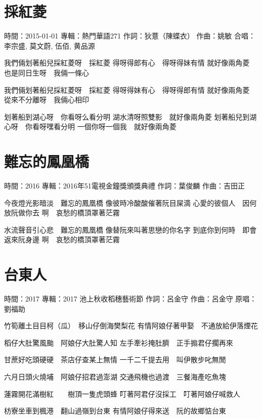 \documentclass[UTF8,a4paper,oneside,twocolumn,12pt]{ctexbook}
\newcommand{\infopair}[2]{\textbullet #1：#2}
\newcommand{\zc}[1][伍佰]{\infopair{作詞}{#1}}
\newcommand{\zq}[1][伍佰]{\infopair{作曲}{#1}}
\newcommand{\zj}[1]{\infopair{專輯}{#1}}
\newcommand{\yc}[1]{\infopair{原唱}{#1}}
\newcommand{\sj}[1]{\infopair{時間}{#1}}
\newenvironment{info}{\begin{flushleft}\kaishu
	}
	{\end{flushleft}\normalsize\yahei\par}
\newenvironment{lyric}{
	}
{}
\begin{document}
\section{採紅菱}
\begin{info}
	\sj{2015-01-01}
	\zj{熱門華語271}
	\zc[狄薏（陳蝶衣）]
	\zq[姚敏]
	\infopair{合唱}{李宗盛, 莫文蔚, 伍佰, 黄品源}
\end{info}
\begin{lyric}
	我們倆划著船兒採紅菱呀　採紅菱
	得呀得郎有心　得呀得妹有情
	就好像兩角菱　也是同日生呀　我倆一條心

	我們倆划著船兒採紅菱呀　採紅菱
	得呀得妹有心　得呀得郎有情
	就好像兩角菱　從來不分離呀　我倆心相印

	划著船到湖心呀　你看呀么看分明
	湖水清呀照雙影　就好像兩角菱
	划著船兒到湖心呀　你看呀嘿看分明
	一個你呀一個我　就好像兩角菱
\end{lyric}

\section{難忘的鳳凰橋}
\begin{info}
	\sj{2016}
	\zj{2016年51電視金鐘獎頒獎典禮}
	\zc[葉俊麟]
	\zq[吉田正]
\end{info}
\begin{lyric}
	今夜燈光影暗淡　難忘的鳳凰橋
	像彼時冷酸酸催著阮目屎滴
	心愛的彼個人　因何放阮做你去
	啊　哀愁的橋頂罩著茫霧

	水流聲音引心悲　難忘的鳳凰橋
	像替阮來叫著思戀的你名字
	到底你到何時　即會返來阮身邊
	啊　哀愁的橋頂罩著茫霧
\end{lyric}

\section{台東人}
\begin{info}
	\sj{2017}
	\zj{2017 池上秋收稻穗藝術節}
	\zc[呂金守]
	\zq[呂金守]
	\yc{劉福助}
\end{info}
\begin{lyric}
	竹筍離土目目柯（瓜）　移山仔倒海樊梨花
	有情阿娘仔著甲娶　不通放給伊落煙花

	稻仔大肚驚風颱　阿娘仔大肚驚人知
	左手牽衫掩肚臍　正手搧君仔擱再來

	甘蔗好吃頭硬硬　茶店仔查某上無情
	一千二千提去用　叫伊散步叱無閒

	六月日頭火燒埔　阿娘仔招君過澎湖
	交通飛機也過渡　三餐海產吃魚塊

	蓮霧開花滿樹紅　　樹頂一隻虎頭蜂
	叮著阿君仔沒採工　叮著阿娘仔喊救人

	枋寮坐車到楓港　翻山過嶺到台東
	有情阿娘仔得來送　阮的故鄉惦台東
\end{lyric}
\end{document}
